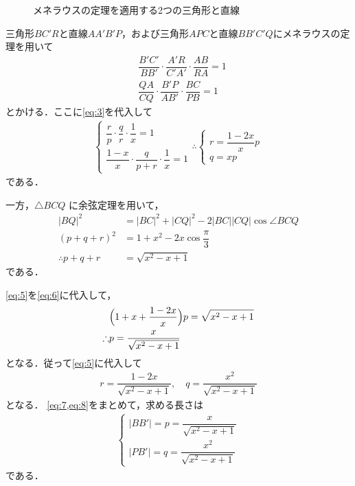 \documentclass[../../main.tex]{subfiles}
\begin{document}
\begin{figure}[htb]
  \caption{メネラウスの定理を適用する2つの三角形と直線}
  \label{fig:menelaus_decomposition}
\end{figure}

三角形$BC'R$と直線$AA'B'P$，および三角形$APC$と直線$BB'C'Q$にメネラウスの定理を用いて
\begin{align}
  & \dfrac{B'C'}{BB'} \cdot \dfrac{A'R}{C'A'} \cdot \dfrac{AB}{RA} = 1 \label{eq:3} \\
  & \dfrac{QA}{CQ} \cdot \dfrac{B'P}{AB'} \cdot \dfrac{BC}{PB} = 1 \label{eq:4}
\end{align}
とかける．ここに\cref{eq:3}を代入して
\begin{align}
  \begin{cases}
    \dfrac{r}{p} \cdot \dfrac{q}{r} \cdot \dfrac{1}{x} = 1 \\
    \dfrac{1-x}{x} \cdot \dfrac{q}{p+r} \cdot \dfrac{1}{x} = 1
  \end{cases}
  \therefore
  \begin{cases}
    r = \dfrac{1-2x}{x} p \\
    q = xp
  \end{cases} \label{eq:5}
\end{align}
である．

一方，$\triangle BCQ$ に余弦定理を用いて，
\begin{align}
  |BQ|^2    &= |BC|^2+|CQ|^2 - 2|BC||CQ|\cos\angle BCQ \\
  (p+q+r)^2 &= 1 + x^2 - 2x\cos\dfrac{\pi}{3} \\
  \therefore
  p + q + r &= \sqrt{x^2 - x + 1} \label{eq:6}
\end{align}
である．

\cref{eq:5}を\cref{eq:6}に代入して，
\begin{align}
  & \Bigl( 1 + x + \dfrac{1-2x}{x} \Bigr) p = \sqrt{x^2 - x + 1} \\
  \therefore
  & p = \dfrac{x}{\sqrt{x^2 - x + 1}} \label{eq:7}
\end{align}
となる．従って\cref{eq:5}に代入して
\begin{align}
  r = \dfrac{1-2x}{\sqrt{x^2 - x + 1}}, \quad q = \dfrac{x^2}{\sqrt{x^2 - x + 1}} \label{eq:8}
\end{align}
となる．
\cref{eq:7,eq:8}をまとめて，求める長さは
\begin{align}
  \begin{cases}
    |BB'| = p = \dfrac{x}{\sqrt{x^2 - x + 1}} \\
    |PB'| = q = \dfrac{x^2}{\sqrt{x^2 - x + 1}}
  \end{cases} \label{eq:9}
\end{align}
である．
\end{document}
